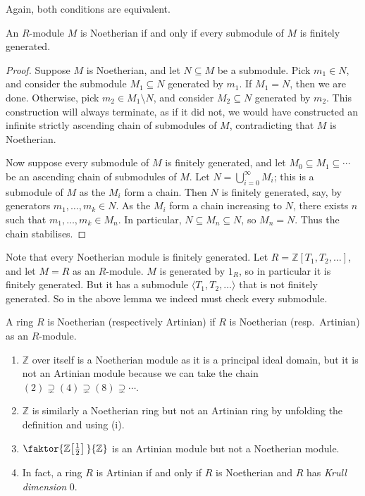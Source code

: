 Again, both conditions are equivalent.
\begin{lemma}
    An \( R \)-module \( M \) is Noetherian if and only if every submodule of \( M \) is finitely generated.
\end{lemma}
\begin{proof}
    Suppose \( M \) is Noetherian, and let \( N \subseteq M \) be a submodule.
    Pick \( m_1 \in N \), and consider the submodule \( M_1 \subseteq N \) generated by \( m_1 \).
    If \( M_1 = N \), then we are done.
    Otherwise, pick \( m_2 \in M_1 \setminus N \), and consider \( M_2 \subseteq N \) generated by \( m_2 \).
    This construction will always terminate, as if it did not, we would have constructed an infinite strictly ascending chain of submodules of \( M \), contradicting that \( M \) is Noetherian.

    Now suppose every submodule of \( M \) is finitely generated, and let \( M_0 \subseteq M_1 \subseteq \cdots \) be an ascending chain of submodules of \( M \).
    Let \( N = \bigcup_{i = 0}^\infty M_i \); this is a submodule of \( M \) as the \( M_i \) form a chain.
    Then \( N \) is finitely generated, say, by generators \( m_1, \dots, m_k \in N \).
    As the \( M_i \) form a chain increasing to \( N \), there exists \( n \) such that \( m_1, \dots, m_k \in M_n \).
    In particular, \( N \subseteq M_n \subseteq N \), so \( M_n = N \).
    Thus the chain stabilises.
\end{proof}
Note that every Noetherian module is finitely generated.
Let \( R = \mathbb Z[T_1, T_2, \dots] \), and let \( M = R \) as an \( R \)-module.
\( M \) is generated by \( 1_R \), so in particular it is finitely generated.
But it has a submodule \( \langle T_1, T_2, \dots \rangle \) that is not finitely generated.
So in the above lemma we indeed must check every submodule.
\begin{definition}
    A ring \( R \) is Noetherian (respectively Artinian) if \( R \) is Noetherian (resp.\ Artinian) as an \( R \)-module.
\end{definition}
\begin{example}
    \begin{enumerate}
        \item \( \mathbb Z \) over itself is a Noetherian module as it is a principal ideal domain, but it is not an Artinian module because we can take the chain \( (2) \supsetneq (4) \supsetneq (8) \supsetneq \cdots \).
        \item \( \mathbb Z \) is similarly a Noetherian ring but not an Artinian ring by unfolding the definition and using (i).
        \item \( \faktor{\mathbb Z\qty[\frac{1}{2}]\,}{\mathbb Z} \) is an Artinian module but not a Noetherian module.
        \item In fact, a ring \( R \) is Artinian if and only if \( R \) is Noetherian and \( R \) has \emph{Krull dimension} 0.
    \end{enumerate}
\end{example}

